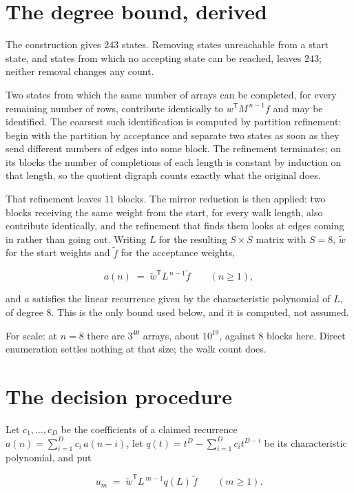 \documentclass[11pt]{article}
\theoremstyle{definition}
\begin{document}
\section{The degree bound, derived}

The construction gives $243$ states. Removing states unreachable from a start state, and states from which no accepting state can be reached, leaves $243$; neither removal changes any count.

Two states from which the same number of arrays can be completed, for every remaining number of rows, contribute identically to $w^{\mathsf T}M^{\,n-1}f$ and may be identified. The coarsest such identification is computed by partition refinement: begin with the partition by acceptance and separate two states as soon as they send different numbers of edges into some block. The refinement terminates; on its blocks the number of completions of each length is constant by induction on that length, so the quotient digraph counts exactly what the original does.

That refinement leaves $11$ blocks. The mirror reduction is then applied: two blocks receiving the same weight from the start, for every walk length, also contribute identically, and the refinement that finds them looks at edges coming in rather than going out. Writing $L$ for the resulting $S \times S$ matrix with $S = 8$, $\tilde w$ for the start weights and $\tilde f$ for the acceptance weights,

\[a(n) \;=\; \tilde w^{\mathsf T} L^{\,n-1} \tilde f \qquad (n \ge 1),\]

and $a$ satisfies the linear recurrence given by the characteristic polynomial of $L$, of degree $8$. This is the only bound used below, and it is computed, not assumed.

For scale: at $n = 8$ there are $3^{40}$ arrays, about $10^{19}$, against $8$ blocks here. Direct enumeration settles nothing at that size; the walk count does.

\section{The decision procedure}

Let $c_1,\dots,c_D$ be the coefficients of a claimed recurrence $a(n) = \sum_{i=1}^{D} c_i\,a(n-i)$, let $q(t) = t^{D} - \sum_{i=1}^{D} c_i t^{D-i}$ be its characteristic polynomial, and put

\[u_m \;=\; \tilde w^{\mathsf T} L^{\,m-1} q(L)\,\tilde f \qquad (m \ge 1).\]
\end{document}
